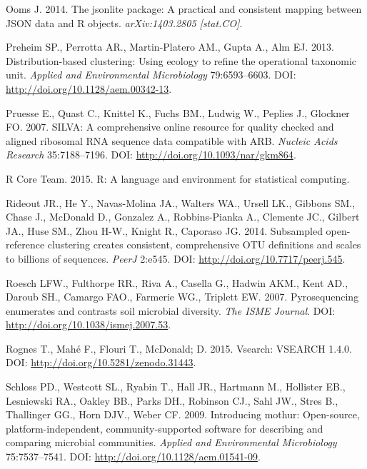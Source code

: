 \documentclass[11pt,]{article}
\begin{document}
Ooms J. 2014. The jsonlite package: A practical and consistent mapping
between JSON data and R objects. \emph{arXiv:1403.2805 {[}stat.CO{]}}.

Preheim SP., Perrotta AR., Martin-Platero AM., Gupta A., Alm EJ. 2013.
Distribution-based clustering: Using ecology to refine the operational
taxonomic unit. \emph{Applied and Environmental Microbiology}
79:6593--6603. DOI: \url{http://doi.org/10.1128/aem.00342-13}.

Pruesse E., Quast C., Knittel K., Fuchs BM., Ludwig W., Peplies J.,
Glockner FO. 2007. SILVA: A comprehensive online resource for quality
checked and aligned ribosomal RNA sequence data compatible with ARB.
\emph{Nucleic Acids Research} 35:7188--7196. DOI:
\url{http://doi.org/10.1093/nar/gkm864}.

R Core Team. 2015. R: A language and environment for statistical
computing.

Rideout JR., He Y., Navas-Molina JA., Walters WA., Ursell LK., Gibbons
SM., Chase J., McDonald D., Gonzalez A., Robbins-Pianka A., Clemente
JC., Gilbert JA., Huse SM., Zhou H-W., Knight R., Caporaso JG. 2014.
Subsampled open-reference clustering creates consistent, comprehensive
OTU definitions and scales to billions of sequences. \emph{PeerJ}
2:e545. DOI: \url{http://doi.org/10.7717/peerj.545}.

Roesch LFW., Fulthorpe RR., Riva A., Casella G., Hadwin AKM., Kent AD.,
Daroub SH., Camargo FAO., Farmerie WG., Triplett EW. 2007.
Pyrosequencing enumerates and contrasts soil microbial diversity.
\emph{The ISME Journal}. DOI:
\url{http://doi.org/10.1038/ismej.2007.53}.

Rognes T., Mahé F., Flouri T., McDonald; D. 2015. Vsearch: VSEARCH
1.4.0. DOI: \url{http://doi.org/10.5281/zenodo.31443}.

Schloss PD., Westcott SL., Ryabin T., Hall JR., Hartmann M., Hollister
EB., Lesniewski RA., Oakley BB., Parks DH., Robinson CJ., Sahl JW.,
Stres B., Thallinger GG., Horn DJV., Weber CF. 2009. Introducing mothur:
Open-source, platform-independent, community-supported software for
describing and comparing microbial communities. \emph{Applied and
Environmental Microbiology} 75:7537--7541. DOI:
\url{http://doi.org/10.1128/aem.01541-09}.
\end{document}
